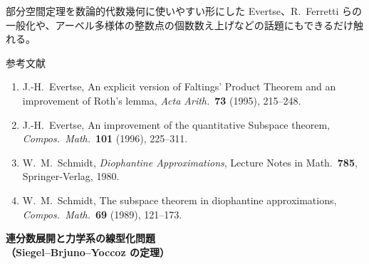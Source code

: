 \documentclass[uplatex,dvipdfmx]{jlreq}
\begin{document}
部分空間定理を数論的代数幾何に使いやすい形にした Evertse、R.~Ferretti
らの一般化や、アーベル多様体の整数点の個数数え上げなどの話題にもできるだけ触れる。

\vspace{1pc}

\begin{center}
  \textsc{参考文献}
\end{center}
\begin{enumerate}
  \item[{[E1]}] J.-H.~Evertse,
        An explicit version of Faltings' Product Theorem and an
        improvement of Roth's lemma,
        \textit{Acta Arith.}~\textbf{73} (1995), 215--248.
  \item[{[E2]}] J.-H.~Evertse,
        An improvement of the quantitative Subspace theorem,
        \textit{Compos.~Math.}~\textbf{101} (1996), 225--311.
  \item[{[Schm1]}] W.~M.~Schmidt,
        \textit{Diophantine Approximations},
        Lecture Notes in Math.~\textbf{785},
        Springer-Verlag, 1980.
  \item[{[Schm2]}] W.~M.~Schmidt,
        The subspace theorem in diophantine approximations,
        \textit{Compos.~Math.}~\textbf{69} (1989), 121--173.
\end{enumerate}

\newpage

\begin{center}
  {\Large\bfseries 連分数展開と力学系の線型化問題\\
  \normalsize （Siegel--Brjuno--Yoccoz の定理）}
\end{center}

\bigskip
\hspace*{\fill}{\large\bfseries 宍倉　光広（京大・理）}

\bigskip
\end{document}
